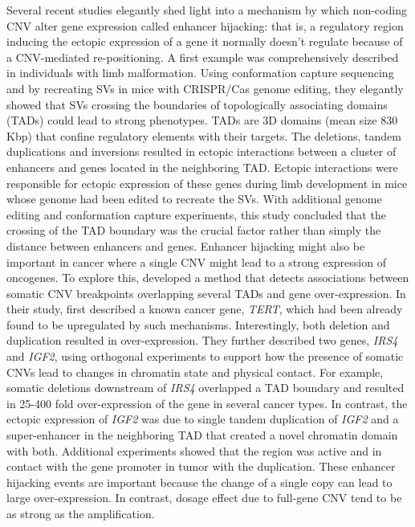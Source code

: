 Several recent studies elegantly shed light into a mechanism by which non-coding CNV alter gene expression called enhancer hijacking: that is, a regulatory region inducing the ectopic expression of a gene it normally doesn't regulate because of a CNV-mediated re-positioning.
A first example was comprehensively described in individuals with limb malformation\cite{Lupianez2015}.
Using conformation capture sequencing and by recreating SVs in mice with CRISPR/Cas genome editing, they elegantly showed that SVs crossing the boundaries of topologically associating domains (TADs) could lead to strong phenotypes.
TADs are 3D domains (mean size 830 Kbp) that confine regulatory elements with their targets.
The deletions, tandem duplications and inversions resulted in ectopic interactions between a cluster of enhancers and genes located in the neighboring TAD.
Ectopic interactions were responsible for ectopic expression of these genes during limb development in mice whose genome had been edited to recreate the SVs.
With additional genome editing and conformation capture experiments, this study concluded that the crossing of the TAD boundary was the crucial factor rather than simply the distance between enhancers and genes.
Enhancer hijacking might also be important in cancer where a single CNV might lead to a strong expression of oncogenes.
To explore this, \citet{Weischenfeldt2016} developed a method that detects associations between somatic CNV breakpoints overlapping several TADs and gene over-expression.
In their study, \citet{Weischenfeldt2016} first described a known cancer gene, {\it TERT}, which had been already found to be upregulated by such mechanisms.
Interestingly, both deletion and duplication resulted in over-expression.
They further described two genes, {\it IRS4} and {\it IGF2}, using orthogonal experiments to support how the presence of somatic CNVs lead to changes in chromatin state and physical contact.
For example, somatic deletions downstream of {\it IRS4} overlapped a TAD boundary and resulted in 25-400 fold over-expression of the gene in several cancer types.
In contrast, the ectopic expression of {\it IGF2} was due to single tandem duplication of {\it IGF2} and a super-enhancer in the neighboring TAD that created a novel chromatin domain with both.
Additional experiments showed that the region was active and in contact with the gene promoter in tumor with the duplication.
These enhancer hijacking events are important because the change of a single copy can lead to large over-expression.
In contrast, dosage effect due to full-gene CNV tend to be as strong as the amplification.

